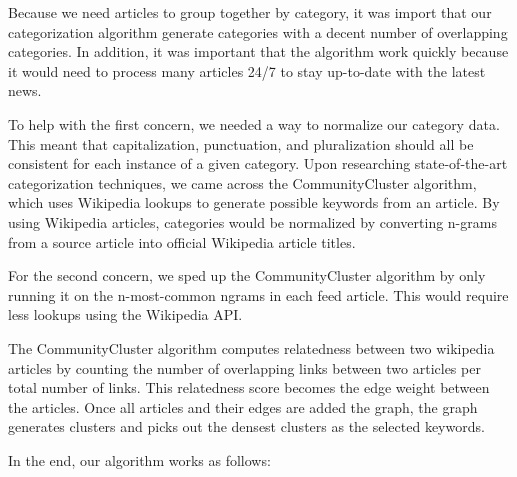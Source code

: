 \documentclass[11pt]{article}
\begin{document}
Because we need articles to group together by category, it was import that our categorization algorithm generate categories with a decent number of overlapping categories. In addition, it was important that the algorithm work quickly because it would need to process many articles 24/7 to stay up-to-date with the latest news.

To help with the first concern, we needed a way to normalize our category data. This meant that capitalization, punctuation, and pluralization should all be consistent for each instance of a given category. Upon researching state-of-the-art categorization techniques, we came across the CommunityCluster algorithm\cite{Grineva}, which uses Wikipedia lookups to generate possible keywords from an article. By using Wikipedia articles, categories would be normalized by converting n-grams from a source article into official Wikipedia article titles.

For the second concern, we sped up the CommunityCluster algorithm by only running it on the n-most-common ngrams in each feed article. This would require less lookups using the Wikipedia API.

The CommunityCluster algorithm computes relatedness between two wikipedia articles by counting the number of overlapping links between two articles per total number of links. This relatedness score becomes the edge weight between the articles. Once all articles and their edges are added the graph, the graph generates clusters and picks out the densest clusters as the selected keywords.

In the end, our algorithm works as follows:
\end{document}
